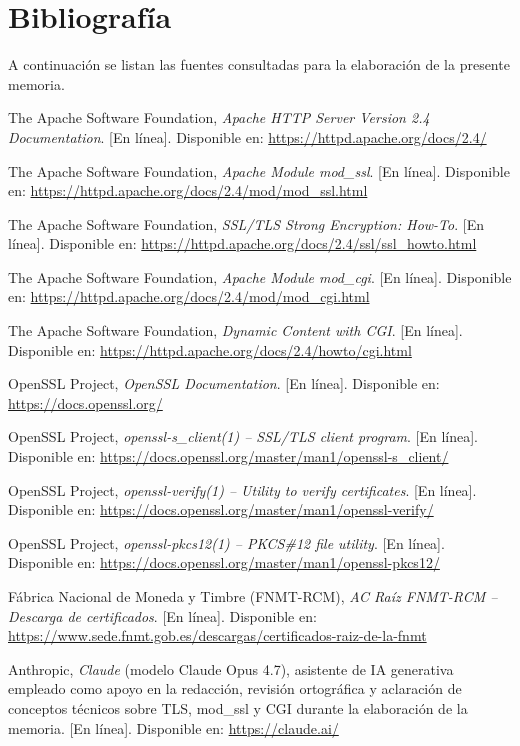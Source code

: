 \chapter{Bibliografía}

A continuación se listan las fuentes consultadas para la elaboración de la presente memoria.

\begin{enumerate}[label={[}\arabic*{]}]
    \item The Apache Software Foundation, \textit{Apache HTTP Server Version 2.4 Documentation}. [En línea]. Disponible en: \url{https://httpd.apache.org/docs/2.4/}
    \item The Apache Software Foundation, \textit{Apache Module mod\_ssl}. [En línea]. Disponible en: \url{https://httpd.apache.org/docs/2.4/mod/mod_ssl.html}
    \item The Apache Software Foundation, \textit{SSL/TLS Strong Encryption: How-To}. [En línea]. Disponible en: \url{https://httpd.apache.org/docs/2.4/ssl/ssl_howto.html}
    \item The Apache Software Foundation, \textit{Apache Module mod\_cgi}. [En línea]. Disponible en: \url{https://httpd.apache.org/docs/2.4/mod/mod_cgi.html}
    \item The Apache Software Foundation, \textit{Dynamic Content with CGI}. [En línea]. Disponible en: \url{https://httpd.apache.org/docs/2.4/howto/cgi.html}
    \item OpenSSL Project, \textit{OpenSSL Documentation}. [En línea]. Disponible en: \url{https://docs.openssl.org/}
    \item OpenSSL Project, \textit{openssl-s\_client(1) -- SSL/TLS client program}. [En línea]. Disponible en: \url{https://docs.openssl.org/master/man1/openssl-s_client/}
    \item OpenSSL Project, \textit{openssl-verify(1) -- Utility to verify certificates}. [En línea]. Disponible en: \url{https://docs.openssl.org/master/man1/openssl-verify/}
    \item OpenSSL Project, \textit{openssl-pkcs12(1) -- PKCS\#12 file utility}. [En línea]. Disponible en: \url{https://docs.openssl.org/master/man1/openssl-pkcs12/}
    \item Fábrica Nacional de Moneda y Timbre (FNMT-RCM), \textit{AC Raíz FNMT-RCM -- Descarga de certificados}. [En línea]. Disponible en: \url{https://www.sede.fnmt.gob.es/descargas/certificados-raiz-de-la-fnmt}
    \item Anthropic, \textit{Claude} (modelo Claude Opus 4.7), asistente de IA generativa empleado como apoyo en la redacción, revisión ortográfica y aclaración de conceptos técnicos sobre TLS, mod\_ssl y CGI durante la elaboración de la memoria. [En línea]. Disponible en: \url{https://claude.ai/}
\end{enumerate}
